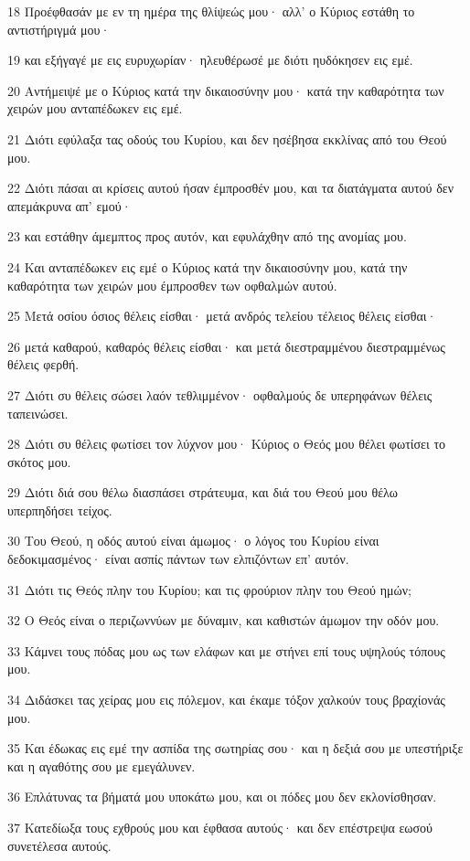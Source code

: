 \par 18 Προέφθασάν με εν τη ημέρα της θλίψεώς μου· αλλ' ο Κύριος εστάθη το αντιστήριγμά μου·
\par 19 και εξήγαγέ με εις ευρυχωρίαν· ηλευθέρωσέ με διότι ηυδόκησεν εις εμέ.
\par 20 Αντήμειψέ με ο Κύριος κατά την δικαιοσύνην μου· κατά την καθαρότητα των χειρών μου ανταπέδωκεν εις εμέ.
\par 21 Διότι εφύλαξα τας οδούς του Κυρίου, και δεν ησέβησα εκκλίνας από του Θεού μου.
\par 22 Διότι πάσαι αι κρίσεις αυτού ήσαν έμπροσθέν μου, και τα διατάγματα αυτού δεν απεμάκρυνα απ' εμού·
\par 23 και εστάθην άμεμπτος προς αυτόν, και εφυλάχθην από της ανομίας μου.
\par 24 Και ανταπέδωκεν εις εμέ ο Κύριος κατά την δικαιοσύνην μου, κατά την καθαρότητα των χειρών μου έμπροσθεν των οφθαλμών αυτού.
\par 25 Μετά οσίου όσιος θέλεις είσθαι· μετά ανδρός τελείου τέλειος θέλεις είσθαι·
\par 26 μετά καθαρού, καθαρός θέλεις είσθαι· και μετά διεστραμμένου διεστραμμένως θέλεις φερθή.
\par 27 Διότι συ θέλεις σώσει λαόν τεθλιμμένον· οφθαλμούς δε υπερηφάνων θέλεις ταπεινώσει.
\par 28 Διότι συ θέλεις φωτίσει τον λύχνον μου· Κύριος ο Θεός μου θέλει φωτίσει το σκότος μου.
\par 29 Διότι διά σου θέλω διασπάσει στράτευμα, και διά του Θεού μου θέλω υπερπηδήσει τείχος.
\par 30 Του Θεού, η οδός αυτού είναι άμωμος· ο λόγος του Κυρίου είναι δεδοκιμασμένος· είναι ασπίς πάντων των ελπιζόντων επ' αυτόν.
\par 31 Διότι τις Θεός πλην του Κυρίου; και τις φρούριον πλην του Θεού ημών;
\par 32 Ο Θεός είναι ο περιζωννύων με δύναμιν, και καθιστών άμωμον την οδόν μου.
\par 33 Κάμνει τους πόδας μου ως των ελάφων και με στήνει επί τους υψηλούς τόπους μου.
\par 34 Διδάσκει τας χείρας μου εις πόλεμον, και έκαμε τόξον χαλκούν τους βραχίονάς μου.
\par 35 Και έδωκας εις εμέ την ασπίδα της σωτηρίας σου· και η δεξιά σου με υπεστήριξε και η αγαθότης σου με εμεγάλυνεν.
\par 36 Επλάτυνας τα βήματά μου υποκάτω μου, και οι πόδες μου δεν εκλονίσθησαν.
\par 37 Κατεδίωξα τους εχθρούς μου και έφθασα αυτούς· και δεν επέστρεψα εωσού συνετέλεσα αυτούς.
